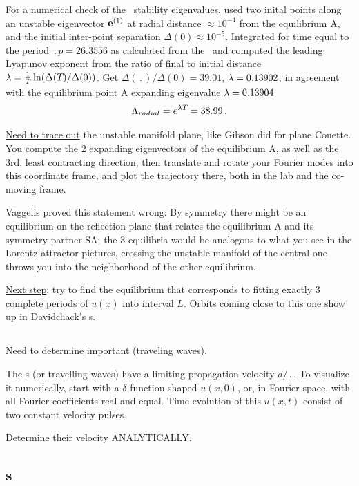 For a numerical check of the \rpo\ stability eigenvalues,
used two inital
points along an unstable eigenvector ${\bf e}^{(1)}$
at radial distance  $\approx 10^{-4}$ from the equilibrium A,
and the initial inter-point separation $\Delta(0) \approx 10^{-5}$.
Integrated for time equal to the period $\period{p}=26.3556$ as calculated from
the \jacobianM\ and computed the leading Lyapunov exponent from the ratio of
final to initial distance 
$\lambda= {1 \over {T_{}}}\ln( \Delta({T_{}})/\Delta(0))$.
Get
$\Delta(\period{})/\Delta(0) =39.01$,
$\lambda=0.13902$, in agreement with the equilibrium point A 
expanding eigenvalue $\lambda=0.13904$
\[
\Lambda_{radial} =  e^{\lambda {T_{}}} =38.99
\,.
\]

\underline{Need to trace out}
the unstable manifold plane, like Gibson did for plane Couette.
You compute the 2 expanding eigenvectors of the
equilibrium A, as well as the 3rd, least contracting direction; then
translate and rotate your Fourier modes into this coordinate frame,
and plot the trajectory there, both in the lab and the co-moving frame.

Vaggelis proved this statement wrong:
By symmetry there might be an equilibrium on the reflection plane that
relates the equilibrium A and its symmetry partner SA; the 3 equilibria would
be analogous to what you see in the Lorentz attractor pictures, crossing
the unstable manifold of the central one throws you into the neighborhood
of the other equilibrium.

\underline{Next step}: try to find the equilibrium that corresponds to fitting
exactly 3 complete periods of $u(x)$ into interval $L$.
Orbits coming close to this one
show up in Davidchack's \rpo s.

\subsection{\Reqva}

\underline{Need to determine} important {\Reqva} (traveling waves).

The \reqva s (or travelling waves) have a limiting propagation
velocity $d/\period{}$. To visualize it numerically,
start with a $\delta$-function
shaped $u(x,0)$, or, in Fourier space, with all Fourier coefficients real
and equal. Time evolution of this  $u(x,t)$ consist of two constant 
velocity pulses.

Determine their velocity ANALYTICALLY.

\subsection{\Rpo s}

